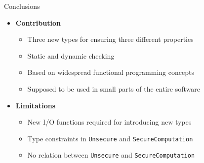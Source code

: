 \begin{frame}{Conclusions}
	\begin{itemize}
		\item \textbf{Contribution}
		\begin{itemize}
			\item Three new types for ensuring three different properties
			\item Static and dynamic checking
			\item Based on widespread functional programming concepts
			\item Supposed to be used in small parts of the entire software
		\end{itemize}
		\vspace{1.5cm}
		\item<2-> \textbf{Limitations}
			\begin{itemize}
				\item New I/O functions required for introducing new types
				\item Type constraints in \texttt{Unsecure} and \texttt{SecureComputation}
				\item No relation between \texttt{Unsecure} and \texttt{SecureComputation}
			\end{itemize}
	\end{itemize}
\end{frame}